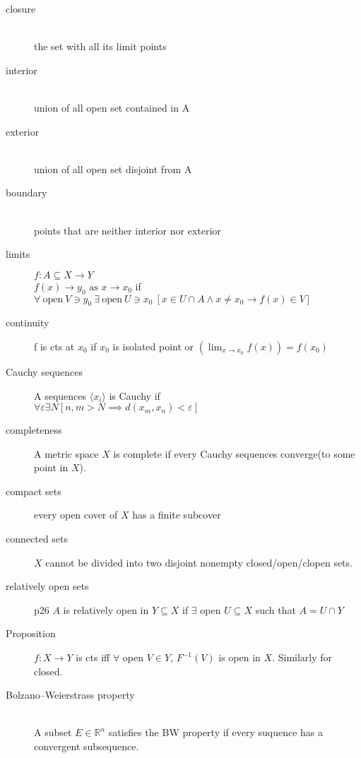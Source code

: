 \begin{description}

\item[closure]\hfill\\
	the set with all its limit points

\item[interior]\hfill\\
	union of all open set contained in A

\item[exterior]\hfill\\
	union of all open set disjoint from A

\item[boundary]\hfill\\
	points that are neither interior nor exterior

\item[limits] $f:A\subseteq X\to Y$\hfill\\
$f(x)\to y_0 \textrm{ as } x\to x_0$ if
$\forall \ \mathrm{open} \ V\ni y_0 \ \exists \ \mathrm{open} \ U\ni x_0
	\ [x\in U\cap A \wedge x\neq x_0 \to f(x)\in V]$

\item[continuity]
	f is cts at $x_0$ if $x_0$ is isolated point or $(\lim_{x\to x_0}f(x)) = f(x_0)$

\item[Cauchy sequences] A sequences $\langle x_i\rangle$ is Cauchy if\hfill\\
	$\forall \varepsilon \exists N [n,m>N\implies d(x_m, x_n)<\varepsilon]$

\item[completeness]
	A metric space $X$ is complete if every Cauchy sequences converge(to some point in $X$).

\item[compact sets]
	every open cover of $X$ has a finite subcover

\item[connected sets]
	$X$ cannot be divided into two disjoint nonempty closed/open/clopen sets.

\item[relatively open sets] p26
	$A$ is relatively open in $Y\subseteq X$ if $\exists$ open $U\subseteq X$ such that $A=U\cap Y$

\item[Proposition]
	$f : X \to Y$ is cts iff $\forall$ open $ V \in Y$, $F^{-1}(V)$ is open in $X$.
	Similarly for closed.

\item[Bolzano–Weierstrass property] \hfill\\
	A subset $E \in \mathbb{R}^n$ satisfies the BW property if every suquence has a convergent subsequence.


\end{description}
